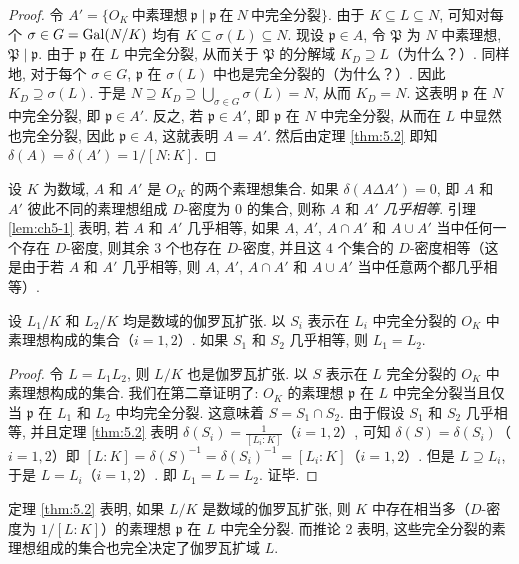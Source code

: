 \begin{proof}
令 $A'=\{O_K\ \text{中素理想}\ \mathfrak{p}\mid\mathfrak{p}\ \text{在}\ N\ \text{中完全分裂}\}$. 由于 $K\subseteq L\subseteq N$, 可知对每个 $\sigma\in G=\operatorname{Gal}(N/K)$ 均有 $K\subseteq\sigma(L)\subseteq N$. 现设 $\mathfrak{p}\in A$, 令 $\mathfrak{P}$ 为 $N$ 中素理想, $\mathfrak{P}\mid\mathfrak{p}$. 由于 $\mathfrak{p}$ 在 $L$ 中完全分裂, 从而关于 $\mathfrak{P}$ 的分解域 $K_D\supseteq L$（为什么？）. 同样地, 对于每个 $\sigma\in G$, $\mathfrak{p}$ 在 $\sigma(L)$ 中也是完全分裂的（为什么？）. 因此 $K_D\supseteq\sigma(L)$. 于是 $N\supseteq K_D\supseteq\bigcup_{\sigma\in G}\sigma(L)=N$, 从而 $K_D=N$. 这表明 $\mathfrak{p}$ 在 $N$ 中完全分裂, 即 $\mathfrak{p}\in A'$. 反之, 若 $\mathfrak{p}\in A'$, 即 $\mathfrak{p}$ 在 $N$ 中完全分裂, 从而在 $L$ 中显然也完全分裂, 因此 $\mathfrak{p}\in A$, 这就表明 $A=A'$. 然后由定理 \ref{thm:5.2} 即知 $\delta(A)=\delta(A')=1/[N:K]$. 
\end{proof}

设 $K$ 为数域, $A$ 和 $A'$ 是 $O_K$ 的两个素理想集合. 如果 $\delta(A\Delta A')=0$, 即 $A$ 和 $A'$ 彼此不同的素理想组成 $D$-密度为 $0$ 的集合, 则称 $A$ 和 $A'$ \emph{几乎相等}. 引理 \ref{lem:ch5-1} 表明, 若 $A$ 和 $A'$ 几乎相等, 如果 $A$, $A'$, $A\cap A'$ 和 $A\cup A'$ 当中任何一个存在 $D$-密度, 则其余 $3$ 个也存在 $D$-密度, 并且这 $4$ 个集合的 $D$-密度相等（这是由于若 $A$ 和 $A'$ 几乎相等, 则 $A$, $A'$, $A\cap A'$ 和 $A\cup A'$ 当中任意两个都几乎相等）. 

\begin{corollary}[2]
设 $L_1/K$ 和 $L_2/K$ 均是数域的伽罗瓦扩张. 以 $S_i$ 表示在 $L_i$ 中完全分裂的 $O_K$ 中素理想构成的集合（$i=1,2$）. 如果 $S_1$ 和 $S_2$ 几乎相等, 则 $L_1=L_2$. 
\end{corollary}

\begin{proof}
令 $L=L_1L_2$, 则 $L/K$ 也是伽罗瓦扩张. 以 $S$ 表示在 $L$ 完全分裂的 $O_K$ 中素理想构成的集合. 我们在第二章证明了: $O_K$ 的素理想 $\mathfrak{p}$ 在 $L$ 中完全分裂当且仅当 $\mathfrak{p}$ 在 $L_1$ 和 $L_2$ 中均完全分裂. 这意味着 $S=S_1\cap S_2$. 由于假设 $S_1$ 和 $S_2$ 几乎相等, 并且定理 \ref{thm:5.2} 表明 $\delta(S_i)=\frac{1}{[L_i:K]}$（$i=1,2$）, 可知 $\delta(S)=\delta(S_i)$（$i=1,2$）即 $[L:K]=\delta(S)^{-1}=\delta(S_i)^{-1}=[L_i:K]$（$i=1,2$）. 但是 $L\supseteq L_i$, 于是 $L=L_i$（$i=1,2$）. 即 $L_1=L=L_2$. 证毕. 
\end{proof}

\begin{remark}
定理 \ref{thm:5.2} 表明, 如果 $L/K$ 是数域的伽罗瓦扩张, 则 $K$ 中存在相当多（$D$-密度为 $1/[L:K]$）的素理想 $\mathfrak{p}$ 在 $L$ 中完全分裂. 而推论 2 表明, 这些完全分裂的素理想组成的集合也完全决定了伽罗瓦扩域 $L$. 
\end{remark}

